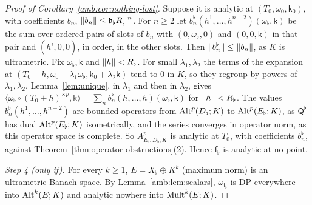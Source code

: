 \begin{proof}[Proof of Corollary~\ref{amb:cor:nothing-lost}]
Suppose it is analytic at $(T_0,\omega_0,\mathsf k_0)$, with coefficients $b_n$, $\lVert b_n\rVert\le \mathfrak b_\flat R_\flat^{-n}$. For $n\ge2$ let $b^\flat_n(h^1,\dots,h^{n-2})(\omega_\flat,\mathsf k)$ be the sum over ordered pairs of slots of $b_n$ with $(0,\omega_\flat,0)$ and $(0,0,\mathsf k)$ in that pair and $(h^i,0,0)$, in order, in the other slots. Then $\lVert b^\flat_n\rVert\le\lVert b_n\rVert$, as $K$ is ultrametric. Fix $\omega_\flat,\mathsf k$ and $\lVert h\rVert<R_\flat$. For small $\lambda_1,\lambda_2$ the terms of the expansion at $(T_0+h,\omega_0+\lambda_1\omega_\flat,\mathsf k_0+\lambda_2\mathsf k)$ tend to $0$ in $K$, so they regroup by powers of $\lambda_1,\lambda_2$. Lemma~\ref{lem:unique}, in $\lambda_1$ and then in $\lambda_2$, gives $\langle\omega_\flat\circ(T_0+h)^{\times p},\mathsf k\rangle=\sum_nb^\flat_n(h,\dots,h)(\omega_\flat,\mathsf k)$ for $\lVert h\rVert<R_\flat$. The values $b^\flat_n(h^1,\dots,h^{n-2})$ are bounded operators from $\operatorname{Alt}^p(D_\flat;K)$ to $\operatorname{Alt}^p(E_\flat;K)$, as $\mathsf Q^\flat$ has dual $\operatorname{Alt}^p(E_\flat;K)$ isometrically, and the series converges in operator norm, as this operator space is complete. So $A^p_{E_\flat,D_\flat;K}$ is analytic at $T_0$, with coefficients $b^\flat_n$, against Theorem~\ref{thm:operator-obstructions}(2). Hence $\mathsf f_\flat$ is analytic at no point.

\emph{Step 4 (only if).} For every $k\ge1$, $E=X_\flat\oplus K^k$ (maximum norm) is an ultrametric Banach space. By Lemma~\ref{amb:lem:scalars}, $\omega_{\mathsf f_\flat}$ is DP everywhere into $\operatorname{Alt}^k(E;K)$ and analytic nowhere into $\operatorname{Mult}^k(E;K)$.
\end{proof}
